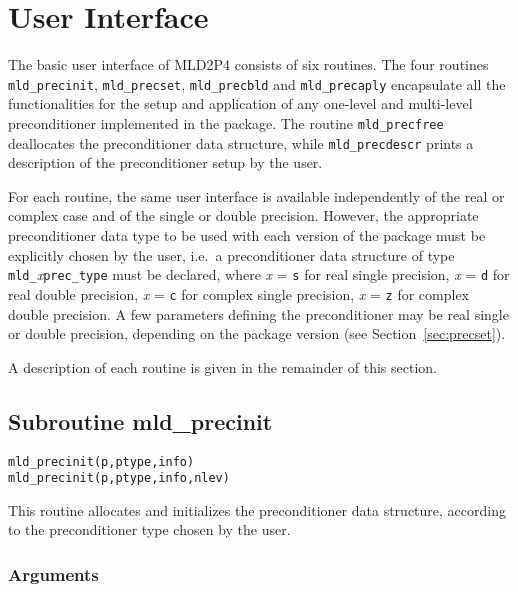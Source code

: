 \section{User Interface\label{sec:highlevel}}

The basic user interface of MLD2P4 consists of six routines. The four routines \verb|mld_precinit|,
\verb|mld_precset|, \verb|mld_precbld| and \verb|mld_precaply| encapsulate all the functionalities
for the setup and application of any one-level and multi-level preconditioner implemented in the package.
The routine \verb|mld_precfree| deallocates the preconditioner data structure, while \verb|mld_precdescr|
prints a description of the preconditioner setup by the user.

For each routine, the same user interface is available independently of the real or complex case
and of the single or double precision. However, the appropriate preconditioner data type to be used with
each version of the package must be explicitly chosen by the user, i.e.\ a preconditioner data structure of type \verb|mld_|\emph{x}\verb|prec_type| must be declared, where \emph{x} = \verb|s| for real single precision,
\emph{x} = \verb|d| for real double precision, \emph{x} = \verb|c| for complex single precision,
\emph{x} = \verb|z| for complex double precision. A few parameters defining the preconditioner may be 
real single or double precision, depending on the package version (see Section~\ref{sec:precset}).

A description of each routine is given in the remainder of this section.


\subsection{Subroutine mld\_precinit\label{sec:precinit}}

\begin{center}
\verb|mld_precinit(p,ptype,info)|\\
\verb|mld_precinit(p,ptype,info,nlev)|
\end{center}

\noindent
This routine allocates and initializes the preconditioner data structure,
according to the preconditioner type chosen by the user.

\subsubsection*{Arguments}

